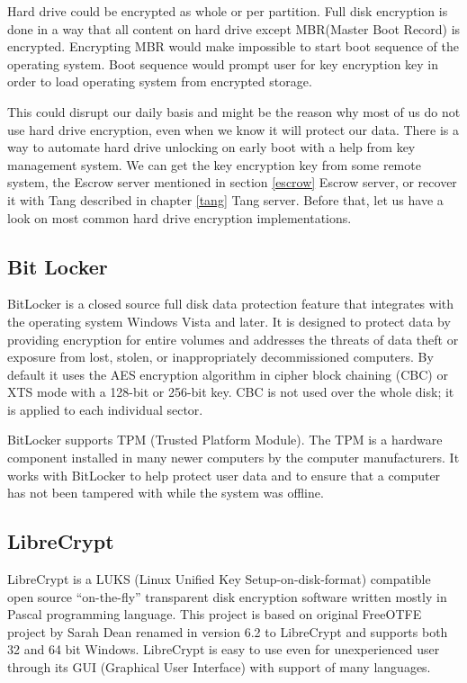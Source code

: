 Hard drive could be encrypted as whole or per partition.
Full disk encryption is done in a way that all content on hard drive except MBR(Master Boot Record) is encrypted.
Encrypting MBR would make impossible to start boot sequence of the operating system.
Boot sequence would prompt user for key encryption key in order to load operating system from encrypted storage.

This could disrupt our daily basis and might be the reason why most of us do not use hard drive encryption, even when we know it will protect our data.
There is a way to automate hard drive unlocking on early boot with a help from key management system.
We can get the key encryption key from some remote system, the Escrow server mentioned in section \ref{escrow} Escrow server, or recover it with Tang described in chapter \ref{tang} Tang server.
Before that, let us have a look on most common hard drive encryption implementations.



\subsection{Bit Locker}
BitLocker is a closed source full disk data protection feature that integrates with the operating system Windows Vista and later.
It is designed to protect data by providing encryption for entire volumes and addresses the threats of data theft or exposure from lost, stolen, or inappropriately decommissioned computers.
By default it uses the AES encryption algorithm in cipher block chaining (CBC) or XTS mode with a 128-bit or 256-bit key.
CBC is not used over the whole disk; it is applied to each individual sector.

BitLocker supports TPM (Trusted Platform Module).
The TPM is a hardware component installed in many newer computers by the computer manufacturers.
It works with BitLocker to help protect user data and to ensure that a computer has not been tampered with while the system was offline\cite{bitlocker}.



\subsection{LibreCrypt}

LibreCrypt is a LUKS (Linux Unified Key Setup-on-disk-format) compatible open source “on-the-fly” transparent disk encryption software written mostly in Pascal programming language.
This project is based on original FreeOTFE project by Sarah Dean renamed in version 6.2 to LibreCrypt and supports both 32 and 64 bit Windows.
LibreCrypt is easy to use even for unexperienced user through its GUI (Graphical User Interface) with support of many languages.

